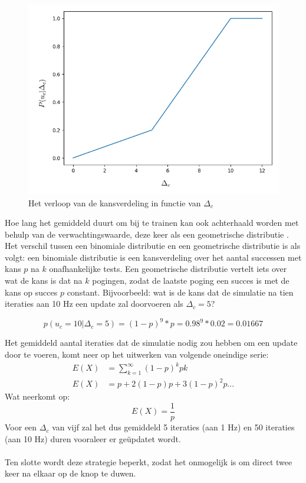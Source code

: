 \begin{figure}[h]
  \centering
  \includegraphics[width=\linewidth]{images/stochastische_kans_cadansupdate.png}
  \caption{Het verloop van de kansverdeling in functie van $\Delta_c$}
  \label{fig:kansverdeling cadansupdate}
\end{figure}

\noindent Hoe lang het gemiddeld duurt om bij te trainen kan ook achterhaald worden met behulp van de verwachtingswaarde, deze keer als een geometrische distributie \cite{geometric wiki}. Het verschil tussen een binomiale distributie en een geometrische distributie is als volgt: een binomiale distributie is een kansverdeling over het aantal successen met kans $p$ na $k$ onafhankelijke tests. Een geometrische distributie vertelt iets over wat de kans is dat na $k$ pogingen, zodat de laatste poging een succes is met de kans op succes $p$ constant. Bijvoorbeeld: wat is de kans dat de simulatie na tien iteraties aan 10 Hz een update zal doorvoeren als $\Delta_c=5$?

\[p(u_c=10|\Delta_c=5)=(1-p)^9*p=0.98^9*0.02=0.01667\]

\noindent Het gemiddeld aantal iteraties dat de simulatie nodig zou hebben om een update door te voeren, komt neer op het uitwerken van volgende oneindige serie:
\begin{align*}
E(X)&=\sum_{k=1}^{\infty} (1-p)^kpk \\
E(X)&=p+2(1-p)p+3(1-p)^2 p...
\end{align*}
Wat neerkomt op:
\[E(X)=\frac{1}{p}\]
Voor een $\Delta_c$ van vijf zal het dus gemiddeld 5 iteraties (aan 1 Hz) en 50 iteraties (aan 10 Hz) duren vooraleer er geüpdatet wordt.
\\\\
Ten slotte wordt deze strategie beperkt, zodat het onmogelijk is om direct twee keer na elkaar op de knop te duwen.

